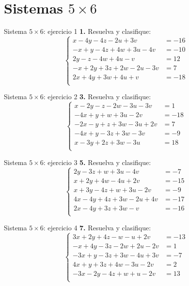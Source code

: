 \documentclass[aspectratio=169,9pt]{beamer}
\theoremstyle{remark}
\begin{document}
\section{Sistemas $5\times 6$}
\begin{frame}{Sistema $5\times 6$: ejercicio 1}
\scriptsize
\textbf{1.} Resuelva y clasifique:
\[\left\{\begin{aligned}
x-4y-4z-2u+3v&=-16\\
-x+y-4z+4w+3u-4v&=-10\\
2y-z-4w+4u-v&=12\\
-x+2y+3z+2w-2u-3v&=7\\
2x+4y+3w+4u+v&=-18\\
\end{aligned}\right.\]
\end{frame}
\begin{frame}{Sistema $5\times 6$: ejercicio 2}
\scriptsize
\textbf{3.} Resuelva y clasifique:
\[\left\{\begin{aligned}
x-2y-z-2w-3u-3v&=1\\
-4x+y+w+3u-2v&=-18\\
-2x-y+z+3w-3u+2v&=7\\
-4x+y-3z+3w-3v&=-9\\
x-3y+2z+3w-3u&=18\\
\end{aligned}\right.\]
\end{frame}
\begin{frame}{Sistema $5\times 6$: ejercicio 3}
\scriptsize
\textbf{5.} Resuelva y clasifique:
\[\left\{\begin{aligned}
2y-3z+w+3u-4v&=-7\\
x+2y+4w-4u+2v&=-15\\
x+3y-4z+w+3u-2v&=-9\\
4x-4y+4z+3w-2u+4v&=-17\\
2x-4y+3z+3w-v&=-16\\
\end{aligned}\right.\]
\end{frame}
\begin{frame}{Sistema $5\times 6$: ejercicio 4}
\scriptsize
\textbf{7.} Resuelva y clasifique:
\[\left\{\begin{aligned}
3x+2y+4z-w-u+2v&=-13\\
-x+4y-3z-2w+2u-2v&=1\\
-3x+y-3z+3w-4u+3v&=-7\\
4x+y+3z+4w-3u-2v&=2\\
-3x-2y-4z+w+u-2v&=13\\
\end{aligned}\right.\]
\end{frame}
\end{document}
